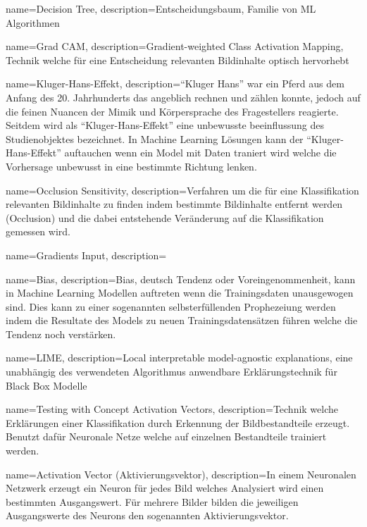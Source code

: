 {
	name=Decision Tree,
	description={Entscheidungsbaum, Familie von ML Algorithmen}                                   
}     

{
	name=Grad CAM,
	description={Gradient-weighted Class Activation Mapping, Technik welche für eine Entscheidung relevanten Bildinhalte optisch hervorhebt}  
}

{
	name=Kluger-Hans-Effekt,
	description={``Kluger Hans'' war ein Pferd aus dem Anfang des 20. Jahrhunderts das angeblich rechnen und zählen konnte, jedoch auf  die feinen Nuancen der Mimik und Körpersprache des Fragestellers reagierte. Seitdem wird als ``Kluger-Hans-Effekt'' eine unbewusste beeinflussung des Studienobjektes bezeichnet. In Machine Learning Lösungen kann der ``Kluger-Hans-Effekt'' auftauchen wenn ein Model mit Daten traniert wird welche die Vorhersage unbewusst in eine bestimmte Richtung lenken.}  
}

{
	name=Occlusion Sensitivity,
	description={Verfahren um die für eine Klassifikation relevanten Bildinhalte zu finden indem bestimmte Bildinhalte entfernt werden (Occlusion) und die dabei entstehende Veränderung auf die Klassifikation gemessen wird.}  
}

{
	name=Gradients Input,
	description={}  
}

{
	name=Bias,
	description={Bias, deutsch Tendenz oder Voreingenommenheit, kann in Machine Learning Modellen auftreten wenn die Trainingsdaten unausgewogen sind. Dies kann zu einer sogenannten selbsterfüllenden Prophezeiung werden indem die Resultate des Models zu neuen Trainingsdatensätzen führen welche die Tendenz noch verstärken.}  
}

{
	name=LIME,
	description={Local interpretable model-agnostic explanations, eine unabhängig des verwendeten Algorithmus anwendbare Erklärungstechnik für Black Box Modelle }
}

{
	name=Testing with Concept Activation Vectors,
	description={Technik welche Erklärungen einer Klassifikation durch Erkennung der Bildbestandteile erzeugt. Benutzt dafür Neuronale Netze welche auf einzelnen Bestandteile trainiert werden. \parencite{Kim2017}}
}

{
	name=Activation Vector (Aktivierungsvektor),
	description={In einem Neuronalen Netzwerk erzeugt ein Neuron für jedes Bild welches Analysiert wird einen bestimmten Ausgangswert. Für mehrere Bilder bilden die jeweiligen Ausgangswerte des Neurons den sogenannten Aktivierungsvektor.}
}

